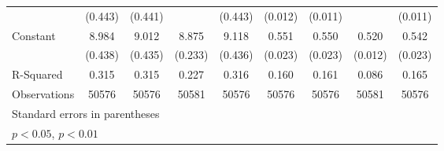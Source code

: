 {\begin{tabular}{l*{8}{c}}
                    &     (0.443)        &     (0.441)        &                    &     (0.443)        &     (0.012)        &     (0.011)        &                    &     (0.011)        \\
Constant            &       8.984\sym{**}&       9.012\sym{**}&       8.875\sym{**}&       9.118\sym{**}&       0.551\sym{**}&       0.550\sym{**}&       0.520\sym{**}&       0.542\sym{**}\\
                    &     (0.438)        &     (0.435)        &     (0.233)        &     (0.436)        &     (0.023)        &     (0.023)        &     (0.012)        &     (0.023)        \\
\midrule
R-Squared           &\multicolumn{1}{c}{0.315}        &\multicolumn{1}{c}{0.315}        &\multicolumn{1}{c}{0.227}        &\multicolumn{1}{c}{0.316}        &\multicolumn{1}{c}{0.160}        &\multicolumn{1}{c}{0.161}        &\multicolumn{1}{c}{0.086}        &\multicolumn{1}{c}{0.165}        \\
Observations        &\multicolumn{1}{c}{50576}        &\multicolumn{1}{c}{50576}        &\multicolumn{1}{c}{50581}        &\multicolumn{1}{c}{50576}        &\multicolumn{1}{c}{50576}        &\multicolumn{1}{c}{50576}        &\multicolumn{1}{c}{50581}        &\multicolumn{1}{c}{50576}        \\
\bottomrule
\multicolumn{9}{l}{\footnotesize Standard errors in parentheses}\\
\multicolumn{9}{l}{\footnotesize \sym{*} \(p<0.05\), \sym{**} \(p<0.01\)}\\
\end{tabular}
}
